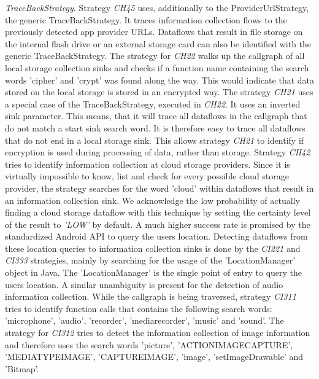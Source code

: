 \textit{TraceBackStrategy}.
Strategy \textit{CH45} uses, additionally to the ProviderUrlStrategy, the generic TraceBackStrategy.
It traces information collection flows to the previously detected app provider URLs.
Dataflows that result in file storage on the internal flash drive or an external storage card can also be identified with the generic TraceBackStrategy.
The strategy for \textit{CH22} walks up the callgraph of all local storage collection sinks and checks if a function name containing the search words 'cipher' and 'crypt' was found along the way.
This would indicate that data stored on the local storage is stored in an encrypted way.
The strategy \textit{CH21} uses a special case of the TraceBackStrategy, executed in \textit{CH22}.
It uses an inverted sink parameter.
This means, that it will trace all dataflows in the callgraph that do not match a start sink search word.
It is therefore easy to trace all dataflows that do not end in a local storage sink.
This allows strategy \textit{CH21} to identify if encryption is used during processing of data, rather than storage.
Strategy \textit{CH42} tries to identify information collection at cloud storage providers.
Since it is virtually impossible to know, list and check for every possible cloud storage provider, the strategy searches for the word 'cloud' within dataflows that result in an information collection sink.
We acknowledge the low probability of actually finding a cloud storage dataflow with this technique by setting the certainty level of the result to \textit{'LOW'} by default.
A much higher success rate is promised by the standardized Android API to query the users location.
Detecting dataflows from these location queries to information collection sinks is done by the \textit{CI221} and \textit{CI333} strategies, mainly by searching for the usage of the 'LocationManager' object in Java.
The 'LocationManager' is the single point of entry to query the users location.
A similar unambiguity is present for the detection of audio information collection.
While the callgraph is being traversed, strategy \textit{CI311} tries to identify function calls that contains the following search words: 'microphone', 'audio', 'recorder', 'mediarecorder', 'music' and 'sound'.
The strategy for \textit{CI312} tries to detect the information collection of image information and therefore uses the search words 'picture', 'ACTION\textunderscore IMAGE\textunderscore CAPTURE', 'MEDIA\textunderscore TYPE\textunderscore IMAGE', 'CAPTURE\textunderscore IMAGE', 'image', 'setImageDrawable' and 'Bitmap'.
